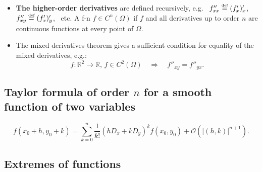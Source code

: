 \documentclass{article}
\newcommand{\Tr}[2]{#1}
\newcommand\Ordo{\mathcal O}
\let\ergo\Rightarrow
\def\Rone{{\mathbb R}}
\begin{document}
\begin{itemize}
\item %
    \Tr{\textbf{The higher-order derivatives} are defined recursively, e.g.}
       {\textbf{Högre ordningens derivator} definieras rekursivt, dvs}
  \ $f''_{xx}\stackrel{\mbox{\tiny def}}=(f'_x)'_x$,
  \ $f''_{xy}\stackrel{\mbox{\tiny def}}=(f'_x)'_y$, \ etc.
A f-n
$f\in C^n(\Omega)$
\Tr{if $f$ and all derivatives up to order}
   {om $f$ och alla dess derivator till ordning}
$n$
\Tr{are continuous functions at every point of}
   {är kontinuerliga funktioner i alla punkter av}
$\Omega$.%

\item %
  \Tr{The mixed derivatives theorem gives a sufficient condition for equality of the mixed derivatives, e.g.:}
     {Ett tillräckligt villkor för likhet av de blandade derivatorna är:}
  $$
  f:\Rone^2\to\Rone,\, f\in C^2(\Omega) \quad\ergo\quad f''_{xy}=f''_{yx}.
  $$%

\end{itemize}%

\subsection*{\Tr{Taylor formula of order $n$ for a smooth function of two variables}%
                {Taylors formel för funktioner av två variabler}
}

\[
f(x_0+h,y_0+k)
= \sum_{k=0}^n \frac1{k!}(hD_x+kD_y)^kf(x_0,y_0) + \Ordo(|(h,k)|^{n+1}).
\]

\subsection*{\Tr{Extremes of functions}%
                {Lokala och globala extrema}
}
\end{document}
